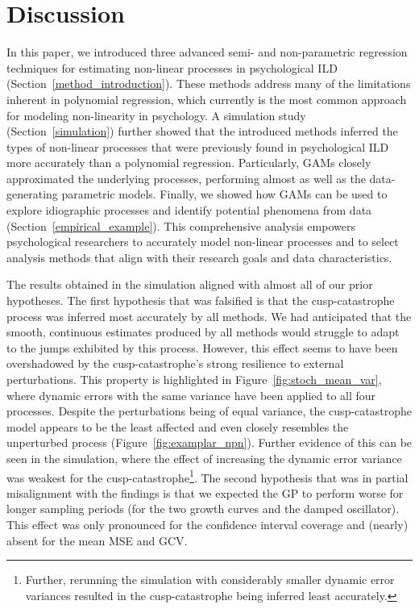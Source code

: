 \documentclass[man, floatsintext]{apa7}
\begin{document}
\section{Discussion}

In this paper, we introduced three advanced semi- and non-parametric regression
techniques for estimating non-linear processes in psychological ILD
(Section~\ref{method_introduction}). These methods address many of the
limitations inherent in polynomial regression, which currently
\textcolor{black}{is} the most common approach for modeling non-linearity in
psychology. A simulation study (Section~\ref{simulation}) further showed that
the introduced methods inferred the types of non-linear processes that were
previously found in psychological ILD more accurately than a polynomial
regression. Particularly, GAMs closely approximated the underlying processes,
performing almost as well as the data-generating parametric models. Finally, we
showed how GAMs can be used to explore idiographic processes and identify
potential phenomena from data (Section~\ref{empirical_example}). This
comprehensive analysis empowers psychological researchers to accurately model
non-linear processes and to select analysis methods that align with their
research goals and data characteristics.

The results obtained in the simulation aligned with almost all of our prior
hypotheses. The first hypothesis that was falsified is that the
cusp-catastrophe process was inferred most accurately by all methods. We had
anticipated that the smooth, continuous estimates produced by all methods would
struggle to adapt to the jumps exhibited by this process. However, this effect
seems to have been overshadowed by the cusp-catastrophe's strong resilience to
external perturbations. This property is highlighted in
Figure~\ref{fig:stoch_mean_var}, where dynamic errors with the
same variance have
been applied to all four processes. Despite the perturbations being of equal
variance, the cusp-catastrophe model appears to be the least affected and even
closely resembles the unperturbed process (Figure~\ref{fig:examplar_npn}).
Further evidence of this can be seen in the simulation, where the effect of
increasing the dynamic error variance was weakest for the
cusp-catastrophe\footnote{Further, rerunning the simulation with considerably
  smaller dynamic error variances resulted in the cusp-catastrophe being
  inferred
  least accurately.}. The second hypothesis that was in partial misalignment
with
the findings is that we expected the GP to perform worse for longer sampling
periods (for the two growth curves and the damped oscillator). This effect was
only pronounced for the confidence interval coverage and (nearly) absent for
the mean MSE and GCV\@.
\end{document}
